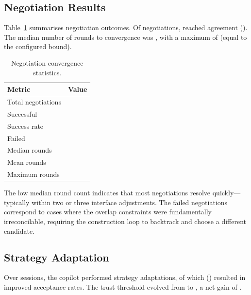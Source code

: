 \documentclass[11pt]{article}
\begin{document}
\subsection{Negotiation Results}\label{sec:expt-neg}

Table~\ref{tab:negotiations} summarises negotiation outcomes.  Of
\ppLXXXVInumNegotiations{} negotiations, \ppLXXXVInegSuccess{}
reached agreement (\ppLXXXVInegSuccessRate{}).  The median number
of rounds to convergence was \ppLXXXVImedianRounds{}, with a
maximum of \ppLXXXVImaxRounds{} (equal to the configured bound).

\begin{table}[t]
\centering
\caption{Negotiation convergence statistics.}\label{tab:negotiations}
\begin{tabular}{lr}
\hline
\textbf{Metric} & \textbf{Value} \\
\hline
Total negotiations         & \ppLXXXVInumNegotiations{} \\
Successful                 & \ppLXXXVInegSuccess{} \\
Success rate               & \ppLXXXVInegSuccessRate{} \\
Failed                     & \ppLXXXVInegFailed{} \\
Median rounds              & \ppLXXXVImedianRounds{} \\
Mean rounds                & \ppLXXXVImeanRounds{} \\
Maximum rounds             & \ppLXXXVImaxRounds{} \\
\hline
\end{tabular}
\end{table}

The low median round count indicates that most negotiations resolve
quickly---typically within two or three interface adjustments.  The
\ppLXXXVInegFailed{} failed negotiations correspond to cases where
the overlap constraints were fundamentally irreconcilable, requiring
the construction loop to backtrack and choose a different candidate.

\subsection{Strategy Adaptation}\label{sec:expt-adapt}

Over \ppLXXXVInumSessions{} sessions, the copilot performed
\ppLXXXVInumAdaptations{} strategy adaptations, of which
\ppLXXXVIadaptImprove{} (\ppLXXXVIadaptImproveRate{}) resulted in
improved acceptance rates.  The trust threshold evolved from
\ppLXXXVIinitTrust{} to \ppLXXXVIfinalTrust{}, a net gain of
\ppLXXXVItrustGain{}.
\end{document}
